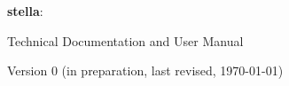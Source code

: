 \begin{center}

{\Huge \textbf{stella}:} \\
\vskip1.5cm



{\Large Technical Documentation and User Manual}

\vspace{0.5in}


Version 0 (in preparation, last revised, \today)

\end{center}


